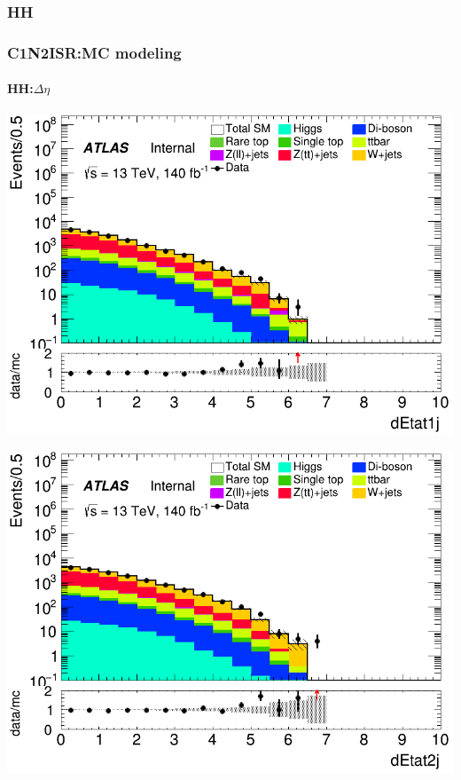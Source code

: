 \documentclass[usenames,dvipsnames]{beamer}
\begin{document}
\subsubsection{HH}
\begin{frame}
\frametitle{C1N2ISR:MC modeling}
\framesubtitle{HH:\quad $\Delta\eta$}
    \begin{minipage}{0.32\textwidth}
        \centering
        \includegraphics[width=\textwidth]{graphics/HH_met/HH_met_dEtat1j.png}
    \end{minipage}
    \hfill
    \begin{minipage}{0.32\textwidth}
        \centering
        \includegraphics[width=\textwidth]{graphics/HH_met/HH_met_dEtat2j.png}
    \end{minipage}
    \hfill
    \begin{minipage}{0.32\textwidth}

\end{minipage}
\end{frame}
\end{document}
